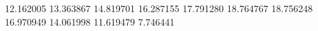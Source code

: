12.162005
13.363867
14.819701
16.287155
17.791280
18.764767
18.756248
16.970949
14.061998
11.619479
7.746441

